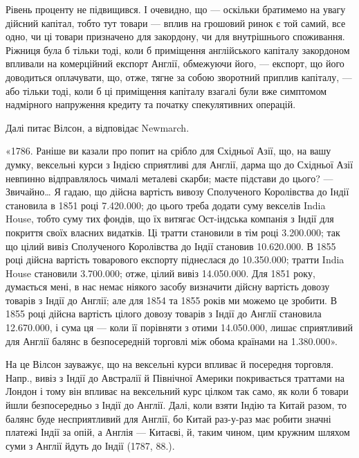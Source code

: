 \parcont{}  %
Рівень проценту не підвищився. І очевидно, що — оскільки братимемо на увагу
дійсний капітал, тобто тут товари — вплив на грошовий ринок є той самий,
все одно, чи ці товари призначено для закордону, чи для внутрішнього споживання.
Ріжниця була б тільки тоді, коли б приміщення англійського капіталу
закордоном впливали на комерційний експорт Англії, обмежуючи його, — експорт,
що його доводиться оплачувати, що, отже, тягне за собою зворотний приплив
капіталу, — або тільки тоді, коли б ці приміщення капіталу взагалі були вже
симптомом надмірного напруження кредиту та початку спекулятивних операцій.

Далі питає Вілсон, а відповідає Newmarch.

«1786. Раніше ви казали про попит на срібло для Східньої Азії, що, на
вашу думку, вексельні курси з Індією сприятливі для Англії, дарма що до Східньої
Азії невпинно відправлялось чималі металеві скарби; маєте підстави до цього? —
Звичайно\dots{} Я гадаю, що дійсна вартість вивозу Сполученого Королівства до
Індії становила в 1851 році \num{7.420.000}; до цього треба додати суму
векселів India House, тобто суму тих фондів, що їх витягає Ост-індська компанія
з Індії для покриття своїх власних видатків. Ці тратти становили в тім році
\num{3.200.000}; так що цілий вивіз Сполученого Королівства до Індії становив
\num{10.620.000}. В 1855 році дійсна вартість товарового експорту піднеслася
до \num{10.350.000}; тратти India House становили \num{3.700.000};
отже, цілий вивіз \num{14.050.000}. Для 1851 року, думається мені, в нас немає
ніякого засобу визначити дійсну вартість довозу товарів з Індії до Англії; але
для 1854 та 1855 років ми можемо це зробити. В 1855 році дійсна вартість
цілого довозу товарів з Індії до Англії становила \num{12.670.000}, і сума ця —
коли її порівняти з отими \num{14.050.000}, лишає сприятливий для Англії
балянс в безпосередній торговлі між обома країнами на \num{1.380.000}».

На це Вілсон зауважує, що на вексельні курси впливає й посередня торговля.
Напр., вивіз з Індії до Австралії й Північної Америки покривається траттами
на Лондон і тому він впливає на вексельний курс цілком так само, як
коли б товари йшли безпосередньо з Індії до Англії. Далі, коли взяти Індію та
Китай разом, то балянс буде несприятливий для Англії, бо Китай раз-у-раз
має робити значні платежі Індії за опій, а Англія — Китаєві, й, таким чином, цим
кружним шляхом суми з Англії йдуть до Індії (1787, 88.).

